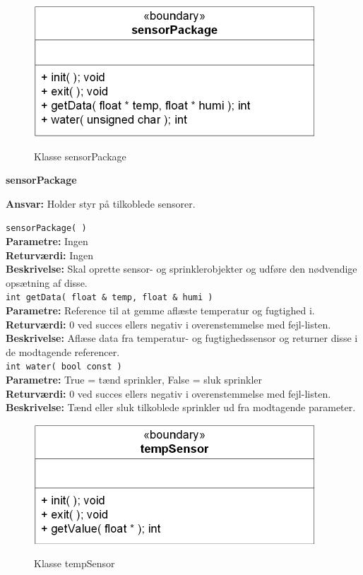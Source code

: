 
\begin{figure}[htbp] \centering
{\includegraphics[scale=1.3]{filer/design/Klassediagrammer/sw_psoc_sensorPackage}}
\caption{Klasse sensorPackage}
\label{fig:sw_psoc_class_sensorPackage}
\end{figure} 

{\centering
\textbf{sensorPackage}\par
}
\textbf{Ansvar:} Holder styr på tilkoblede sensorer. \

\verb+sensorPackage( ) +\\
\textbf{Parametre:} Ingen \\
\textbf{Returværdi:} Ingen \\
\textbf{Beskrivelse:} Skal oprette sensor- og sprinklerobjekter og udføre den nødvendige opsætning af disse. \\

\verb+int getData( float & temp, float & humi )+ \\
\textbf{Parametre:} Reference til at gemme aflæste temperatur og fugtighed i. \\
\textbf{Returværdi:} 0 ved succes ellers negativ i overenstemmelse med fejl-listen. \\
\textbf{Beskrivelse:} Aflæse data fra temperatur- og fugtighedssensor og returner disse i de modtagende referencer. \\

\verb+int water( bool const )+ \\
\textbf{Parametre:} True = tænd sprinkler, False = sluk sprinkler \\
\textbf{Returværdi:} 0 ved succes ellers negativ i overenstemmelse med fejl-listen. \\
\textbf{Beskrivelse:} Tænd eller sluk tilkoblede sprinkler ud fra modtagende parameter. \\


\begin{figure}[htbp] \centering
{\includegraphics[scale=1.3]{filer/design/Klassediagrammer/sw_psoc_tempSensor}}
\caption{Klasse tempSensor}
\label{fig:sw_psoc_class_tempSensor}
\end{figure} 

